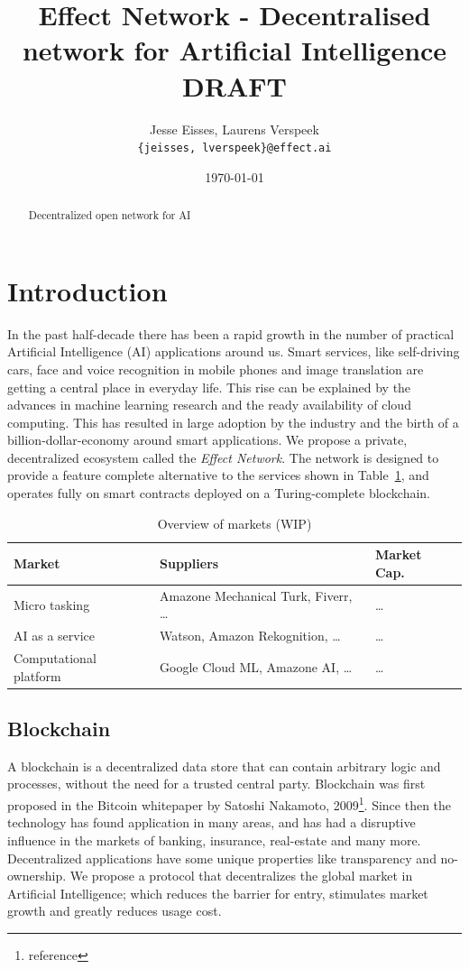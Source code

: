 \documentclass{article}
\title{Effect Network - Decentralised network for Artificial Intelligence \\ \vspace{16pt} \large \textbf{DRAFT}}
\date{\today}
\author{Jesse Eisses, Laurens Verspeek \\
  \small \texttt{\{jeisses, lverspeek\}@effect.ai}}
\begin{document}
\maketitle

\begin{abstract}
Decentralized open network for AI
\end{abstract}

\tableofcontents


\section{Introduction}
In the past half-decade there has been a rapid growth in the number of
practical Artificial Intelligence (AI) applications around us. Smart
services, like self-driving cars, face and voice recognition in mobile
phones and image translation are getting a central place in everyday
life. This rise can be explained by the advances in machine learning
research and the ready availability of cloud computing. This has
resulted in large adoption by the industry and the birth of a
billion-dollar-economy around smart applications. We propose a
private, decentralized ecosystem called the \emph{Effect Network}. The
network is designed to provide a feature complete alternative to the
services shown in Table~\ref{tab:service_compare}, and operates fully
on smart contracts deployed on a Turing-complete blockchain.

\begin{table}
  \centering
  \begin{tabular}[h]{l|l|l}
    \textbf{Market} & \textbf{Suppliers} & \textbf{Market Cap.} \\ \hline
    Micro tasking & Amazone Mechanical Turk, Fiverr, \dots & \dots \\ 
    AI as a service & Watson, Amazon Rekognition, \dots & \dots \\
    Computational platform & Google Cloud ML, Amazone AI, \dots & \dots 
  \end{tabular}
  \caption{Overview of markets (WIP)}\label{tab:service_compare}
\end{table}

\subsection{Blockchain}
A blockchain is a decentralized data store that can contain arbitrary
logic and processes, without the need for a trusted central
party. Blockchain was first proposed in the Bitcoin whitepaper by
Satoshi Nakamoto, 2009\footnote{reference}. Since then the technology
has found application in many areas, and has had a disruptive
influence in the markets of banking, insurance, real-estate and many
more. Decentralized applications have some unique properties like
transparency and no-ownership. We propose a protocol that
decentralizes the global market in Artificial Intelligence; which
reduces the barrier for entry, stimulates market growth and greatly
reduces usage cost.
\end{document}
